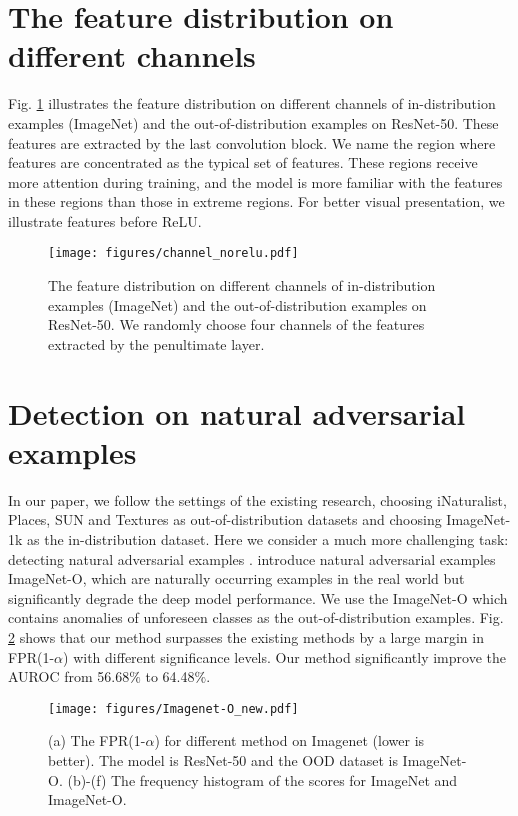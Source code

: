 \documentclass{article}
\begin{document}
\section{The feature distribution on different channels}\label{App:channels}

Fig. \ref{img:channels} illustrates the feature distribution on different channels of in-distribution examples (ImageNet) and the out-of-distribution examples on ResNet-50. These features are extracted by the last convolution block. We name the region where features are concentrated as the typical set of features. These regions receive more attention during training, and the model is more familiar with the features in these regions than those in extreme regions.
For better visual presentation, we illustrate features before ReLU.


\begin{figure}[htbp]
\centering
\texttt{[image: figures/channel\_norelu.pdf]}
\caption{The feature distribution on different channels of in-distribution examples (ImageNet) and the out-of-distribution examples on ResNet-50. We randomly choose four channels of the features extracted by the penultimate layer.}
\label{img:channels}
\end{figure}


\section{Detection on natural adversarial examples}\label{App:NAE}
In our paper, we follow the settings of the existing research, choosing iNaturalist, Places, SUN and Textures as out-of-distribution datasets and choosing ImageNet-1k as the in-distribution dataset. Here we consider a much more challenging task: detecting natural adversarial examples \cite{hendrycks2021nae}. \citet{hendrycks2021nae} introduce natural adversarial examples ImageNet-O, which are naturally occurring examples in the real world but significantly degrade the deep model performance. We use the ImageNet-O \cite{hendrycks2021nae} which contains anomalies of unforeseen classes as the out-of-distribution examples. Fig. \ref{img:imagenet-o} shows that our method surpasses the existing methods by a large margin in FPR(1-$\alpha$) with different significance levels. Our method significantly improve the AUROC from 56.68$\%$ to 64.48$\%$.

\begin{figure}[htbp]
\centering
\texttt{[image: figures/Imagenet-O\_new.pdf]}
\caption{(a) The FPR(1-$\alpha$) for different method on Imagenet (lower is better). The model is ResNet-50 and the OOD dataset is ImageNet-O. (b)-(f) The frequency histogram of the scores for ImageNet and ImageNet-O.}
\label{img:imagenet-o}
\end{figure}
\end{document}
